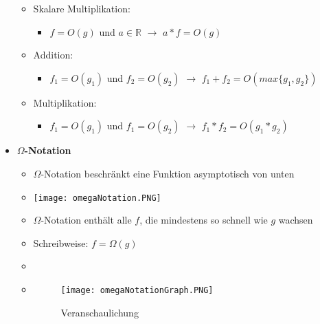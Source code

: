 \begin{itemize}
\begin{itemize}
                \item Skalare Multiplikation:
                    \begin{itemize}
                        \item $f= O(g)$ und $a \in \mathbb{R}$ $\rightarrow$ $a*f = O(g)$
                    \end{itemize}
                
                \item Addition: 
                    \begin{itemize}
                        \item $f_1 = O(g_1)$ und $f_2 = O(g_2)$ $\rightarrow$ $f_1+f_2= O(max\{g_1,g_2\})$
                    \end{itemize}
                
                \item Multiplikation:
                    \begin{itemize}
                        \item $f_1 = O(g_1)$ und $f_1 = O(g_2)$ $\rightarrow$ $f_1*f_2= O(g_1*g_2)$
                    \end{itemize}
            \end{itemize}
        
\pagebreak

        \item \textbf{$\Omega$-Notation}
            \begin{itemize}
                \item $\Omega$-Notation beschränkt eine Funktion asymptotisch von unten
                \item[] \texttt{[image: omegaNotation.PNG]}
                \item $\Omega$-Notation enthält alle $f$, die mindestens so schnell wie $g$ wachsen
                \item Schreibweise: $f = \Omega(g)$
                \item[]
                \item[] 
                    \begin{minipage}{0.3\textwidth}
                    \begin{figure}[H]
                        \centering
                        \texttt{[image: omegaNotationGraph.PNG]}
                        \caption{Veranschaulichung}
                        \label{}
                    \end{figure}
                    \end{minipage}
                    \begin{minipage}[t]{0.6\textwidth}
                    \vspace{-3cm}
                    \end{minipage}
            \end{itemize}
        

\end{itemize}
